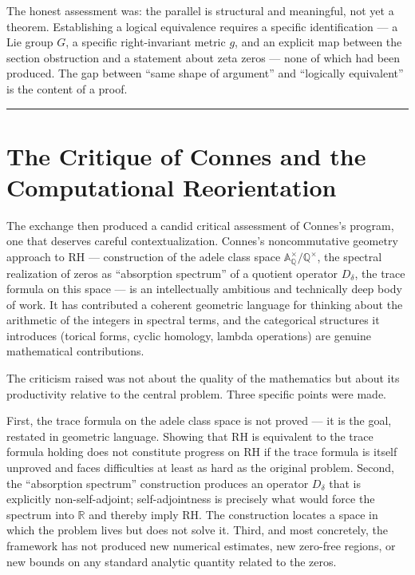 \documentclass[12pt]{article}
\begin{document}
The honest assessment was: the parallel is structural and meaningful, not yet a
theorem. Establishing a logical equivalence requires a specific identification --- a
Lie group $G$, a specific right-invariant metric $g$, and an explicit map between the
section obstruction and a statement about zeta zeros --- none of which had been
produced. The gap between ``same shape of argument'' and ``logically equivalent'' is
the content of a proof.

\bigskip
\hrule
\bigskip

\section{The Critique of Connes and the Computational Reorientation}

The exchange then produced a candid critical assessment of Connes's program, one that
deserves careful contextualization. Connes's noncommutative geometry approach to RH ---
construction of the adele class space $\mathbb{A}_{\mathbb{Q}}^\times / \mathbb{Q}^\times$,
the spectral realization of zeros as ``absorption spectrum'' of a quotient operator
$D_\delta$, the trace formula on this space --- is an intellectually ambitious and
technically deep body of work. It has contributed a coherent geometric language for
thinking about the arithmetic of the integers in spectral terms, and the categorical
structures it introduces (torical forms, cyclic homology, lambda operations) are genuine
mathematical contributions.

The criticism raised was not about the quality of the mathematics but about its
productivity relative to the central problem. Three specific points were made.

First, the trace formula on the adele class space is not proved --- it is the goal,
restated in geometric language. Showing that RH is equivalent to the trace formula
holding does not constitute progress on RH if the trace formula is itself unproved and
faces difficulties at least as hard as the original problem. Second, the ``absorption
spectrum'' construction produces an operator $D_\delta$ that is explicitly
non-self-adjoint; self-adjointness is precisely what would force the spectrum into
$\mathbb{R}$ and thereby imply RH. The construction locates a space in which the
problem lives but does not solve it. Third, and most concretely, the framework has not
produced new numerical estimates, new zero-free regions, or new bounds on any standard
analytic quantity related to the zeros.
\end{document}
